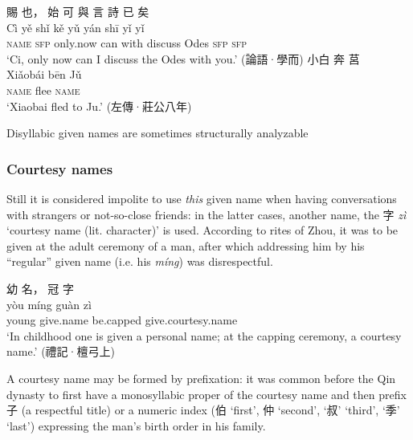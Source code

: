 \documentclass[UTF8, a4paper, oneside, scheme=plain, 12pt]{ctexrep}
\newcommand{\form}[1]{\emph{#1}}
\newcommand{\translate}[1]{`#1'}
\newcommand*{\category}[1]{\textsc{#1}}
\begin{document}
\begin{exe}
    \ex\label{ex:nouns.proper-nouns.person.given.monosyllabic.1}
    \glll 賜 也， 始 可 與 言 詩 已 矣 \\
    Cì yě shǐ kě yǔ yán shī yǐ yǐ \\
    \category{name} \category{sfp} only.now can with discuss Odes \category{sfp} \category{sfp} \\
    \glt\translate{Ci, only now can I discuss the Odes with you.} \hfill (論語·學而)
    \ex\label{ex:nouns.proper-nouns.person.given.disyllabic.1}
    \glll 小白 奔 莒 \\
    Xiǎobái bēn Jǔ \\
    \category{name} flee \category{name} \\
    \glt\translate{Xiaobai fled to Ju.} \hfill (左傳·莊公八年)
\end{exe}



Disyllabic given names are sometimes structurally analyzable 

\subsubsection{Courtesy names}

Still it is considered impolite to use \emph{this} given name when having conversations with strangers or not-so-close friends:
in the latter cases, another name, the 字 \form{zì} \translate{courtesy name (lit. character)} is used.
According to rites of Zhou,
it was to be given at the adult ceremony of a man,
after which addressing him by his ``regular'' given name (i.e. his \form{míng}) was disrespectful.

\begin{exe}
    \ex
    \glll 幼 名， 冠 字 \\
    yòu míng guàn zì \\
    young give.name be.capped give.courtesy.name \\
    \glt\translate{In childhood one is given a personal name; at the capping ceremony, a courtesy name.} \hfill (禮記·檀弓上)
\end{exe}



A courtesy name may be formed by prefixation:
it was common before the Qin dynasty to first have a monosyllabic proper of the courtesy name
and then prefix 子 (a respectful title) or a numeric index (伯 \translate{first}, 仲 \translate{second}, \translate{叔} \translate{third}, \translate{季} \translate{last}) expressing the man's birth order in his family.
\end{document}
